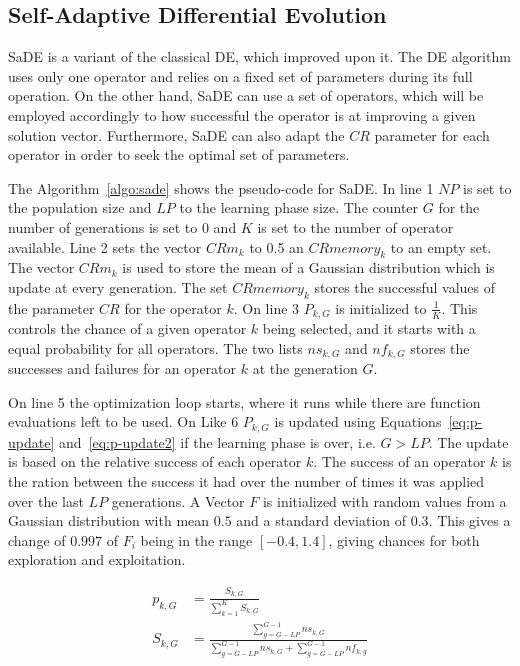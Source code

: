 \subsection{Self-Adaptive Differential Evolution}

\ac{SaDE} is a variant of the classical \ac{DE}, which improved upon it. The \ac{DE} algorithm
uses only one operator and relies on a fixed set of parameters during its full
operation. On the other hand, \ac{SaDE} can use a set of operators, which will
be employed accordingly to how successful the operator is at improving
a given solution vector. Furthermore, \ac{SaDE} can also adapt the $CR$ parameter
for each operator in order to seek the optimal set of parameters.

The Algorithm~\ref{algo:sade} shows the pseudo-code for \ac{SaDE}. In line 1
$NP$ is set to the population size and $LP$ to the learning phase size.
The counter $G$ for the number of generations is set to 0 and
$K$ is set to the number of operator available. Line 2 sets the vector
$CRm_k$ to 0.5 an $CRmemory_k$ to an empty set. The vector $CRm_k$ is used
to store the mean of a Gaussian distribution which is update at every
generation. The set $CRmemory_k$ stores the successful values of the 
parameter $CR$ for the operator $k$. On line 3 $P_{k,G}$ is initialized
to $\frac{1}{K}$. This controls the chance of a given operator $k$ being
selected, and it starts with a equal probability for all operators. The
two lists $ns_{k,G}$ and $nf_{k, G}$ stores the successes and failures
for an operator $k$ at the generation $G$.

On line 5 the optimization loop starts, where it runs while there are
function evaluations left to be used. On Like 6 $P_{k,G}$ is updated using
Equations~\eqref{eq:p-update} and~\eqref{eq:p-update2}
if the learning phase is over, i.e. $G > LP$.
The update is based on the relative success of each operator $k$. The success
of an operator $k$ is the ration between the success it had over the number of
times it was applied over the last $LP$ generations. A Vector $F$ is initialized
with random values from a Gaussian distribution with mean $0.5$ and a standard
deviation of $0.3$. This gives a change of $0.997$ of $F_i$ being in the range
$[-0.4, 1.4]$, giving chances for both exploration and exploitation.

\begin{align} \label{eq:p-update}
    p_{k,G} &= \frac{S_{k,G}}{\sum^{K}_{k=1}S_{k,G}} \\
    \label{eq:p-update2}
    S_{k,G} &= \frac{\sum^{G-1}_{g=G-LP}ns_{k,G}}{\sum^{G-1}_{g=G-LP}ns_{k,G} + \sum^{G-1}_{g=G-LP}nf_{k,g}}
\end{align}

